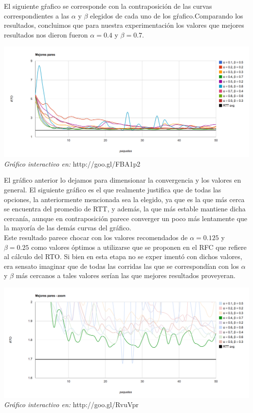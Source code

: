 \indent

\indent El siguiente gŕafico se corresponde con la contraposición de las curvas correspondientes a las $\alpha$ y $\beta$ elegidos de cada uno de los gŕafico.Comparando los resultados, concluimos que para nuestra experimentación los valores que mejores resultados nos dieron fueron $\alpha = 0.4$ y $\beta = 0.7$.\\ 

\begin{center}
	\includegraphics[scale=0.35]{graphics/best_pairs.png}
	\textit{Gráfico interactivo en:} http://goo.gl/FBA1p2
\end{center}

\indent El gráfico anterior lo dejamos para dimensionar la convergencia y los valores en general. El siguiente gráfico es el que realmente justifica que de todas las opciones, la anteriormente mencionada sea la elegido, ya que es la que más cerca se encuentra del promedio de RTT, y además, la que más estable mantiene dicha cercanía, aunque en contraposición parece converger un poco más lentamente que la mayoría de las demás curvas del gráfico.\\
\indent Este resultado parece chocar con los valores recomendados de $\alpha = 0.125$  y $\beta = 0.25$ como valores óptimos a utilizarse que se proponen en el RFC que refiere al cálculo del RTO. Si bien en esta etapa no se exper	imentó con dichos valores, era sensato imaginar que de todas las corridas las que se correspondían con los $\alpha$ y $\beta$ más cercanos a tales valores serían las que mejores resultados proveyeran.\\

\begin{center}
	\includegraphics[scale=0.35]{graphics/best_pairs_zoom.png}
	\textit{Gráfico interactivo en:} http://goo.gl/RvuVpr
\end{center}

